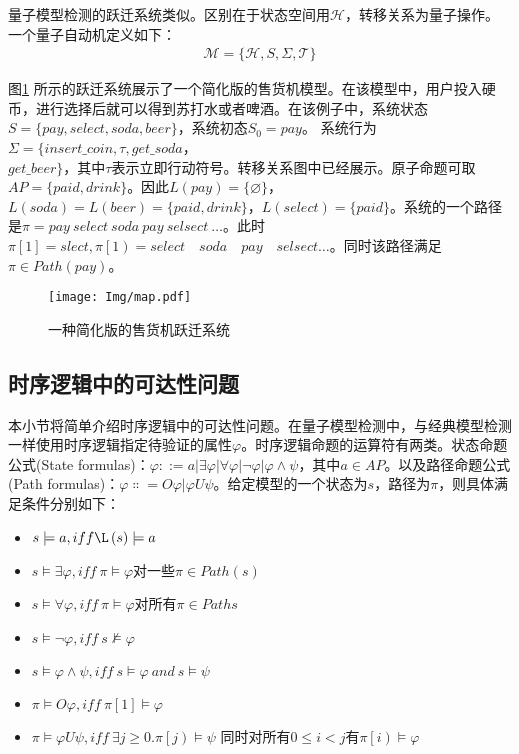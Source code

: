 量子模型检测的跃迁系统类似。区别在于状态空间用\(\mathcal{H}\)，转移关系为量子操作。一个量子自动机定义如下：
\begin{align}
    \mathcal{M}=\{\mathcal{H},S,\Sigma,\mathcal{T}\}
\end{align}
\begin{example}
    
    图\ref{fig:transition-system} 所示的跃迁系统展示了一个简化版的售货机模型。在该模型中，用户投入硬币，进行选择后就可以得到苏打水或者啤酒。在该例子中，系统状态\(S=\{pay,select,soda,beer\}\)，系统初态\(S_0=pay\)。
    系统行为\(\Sigma=\{insert\_coin,\tau,get\_soda\)，\\\(get\_beer\}\)，其中\(\tau\)表示立即行动符号。转移关系图中已经展示。原子命题可取\(AP=\{paid,drink\}\)。因此\(L\left( pay \right)=\{\varnothing\}\)，\(L\left(soda\right)=L\left(beer\right)=\{paid,drink\}\)，\(L\left(select\right)=\{paid\}\)。系统的一个路径是\(\pi=pay\ select\ soda\ pay\ selsect\ \ldots\)。此时\(\pi\left[1\right]=slect,\pi\left[1\right)=select\quad soda\quad pay\quad selsect\ldots\)。同时该路径满足\(\pi\in Path\left(pay\right)\)。
    \begin{figure}[!htbp]
        \centering
        \texttt{[image: Img/map.pdf]}
        \caption{一种简化版的售货机跃迁系统}
        \label{fig:transition-system}
    \end{figure}
\end{example}

\subsection{时序逻辑中的可达性问题}
本小节将简单介绍时序逻辑中的可达性问题。在量子模型检测中，与经典模型检测一样使用时序逻辑指定待验证的属性\(\varphi\)。时序逻辑命题的运算符有两类\citep{goranko_2023}。状态命题公式(State formulas)：\(\varphi ::=a\left|\exists\varphi\right|\forall \varphi\left|\lnot\varphi\right|\varphi\land\psi\)，其中\(a\in AP\)。以及路径命题公式(Path formulas)：\(\varphi\Colon=O\varphi|\varphi U\psi\)。给定模型的一个状态为\(s\)，路径为\(\pi\)，则具体满足条件分别如下：
\begin{itemize}
    \item \(s\models a,iff \L\left(s\right)\models a\)
    \item \(s\models\exists\varphi,iff\ \pi\models\varphi\)对一些\(\pi\in Path\left(s\right)\)
    \item \(s\models\forall\varphi,iff\ \pi\models\varphi\)对所有\(π\in Paths\)
    \item \(s\models\lnot\varphi,iff\ s\nvDash\varphi\)
    \item \(s\models\varphi\land\psi,iff\ s\models\varphi\ and\ s\models\psi\)
    \item \(\pi\models O\varphi,iff\ \pi\left[1\right]\models\varphi\)
    \item \(\pi\models\varphi U\psi,iff\ \exists j\geq0\).\(\pi\left[j\right)\models\psi\) 同时对所有\(0\le i<j\)有\(\pi\left[i\right)\models\varphi\)
\end{itemize}


